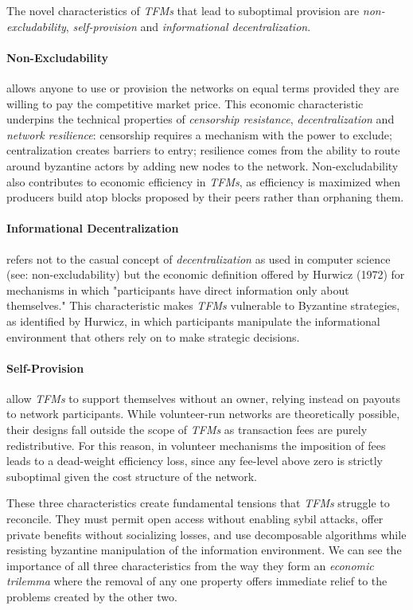 
The novel characteristics of \textit{TFMs} that lead to suboptimal provision are \emph{non-excludability}, \emph{self-provision} and \emph{informational decentralization}. 

\paragraph{Non-Excludability} allows anyone to use or provision the networks on equal terms provided they are willing to pay the competitive market price. This economic characteristic underpins the technical properties of \textit{censorship resistance}, \textit{decentralization} and \textit{network resilience}: censorship requires a mechanism with the power to exclude; centralization creates barriers to entry; resilience comes from the ability to route around byzantine actors by adding new nodes to the network. Non-excludability also contributes to economic efficiency in \textit{TFMs}, as efficiency is maximized when producers build atop blocks proposed by their peers rather than orphaning them.

\paragraph{Informational Decentralization} refers not to the casual concept of \textit{decentralization} as used in computer science (see: non-excludability) but the economic definition offered by Hurwicz (1972) for mechanisms in which "participants have direct information only about themselves." This characteristic makes \textit{TFMs} vulnerable to Byzantine strategies, as identified by Hurwicz, in which participants manipulate the informational environment that others rely on to make strategic decisions.

\paragraph{Self-Provision} allow \textit{TFMs} to support themselves without an owner, relying instead on payouts to network participants. While volunteer-run networks are theoretically possible, their designs fall outside the scope of \textit{TFMs} as transaction fees are purely redistributive. For this reason, in volunteer mechanisms the imposition of fees leads to a dead-weight efficiency loss, since any fee-level above zero is strictly suboptimal given the cost structure of the network.

These three characteristics create fundamental tensions that \textit{TFMs} struggle to reconcile. They must permit open access without enabling sybil attacks, offer private benefits without socializing losses, and use decomposable algorithms while resisting byzantine manipulation of the information environment. We can see the importance of all three characteristics from the way they form an \emph{economic trilemma} where the removal of any one property offers immediate relief to the problems created by the other two.

